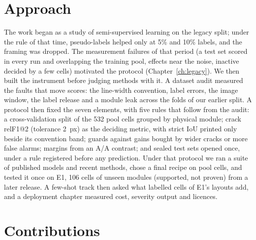 \section{Approach}\label{sec:intro-approach}

The work began as a study of semi-supervised learning on the legacy split; under the rule of that time, pseudo-labels helped only
at 5\% and 10\% labels, and the framing was dropped. The measurement failures of that period (a test set scored in every run and overlapping
the training pool, effects near the noise, inactive decided by a few cells) motivated the protocol (Chapter~\ref{ch:legacy}). We
then built the instrument before judging methods with it. A dataset audit measured the faults that move scores: the line-width
convention, label errors, the image window, the label release and a module leak across the folds of our earlier split. A protocol
then fixed the seven elements, with five rules that follow from the audit: a cross-validation split of the 532 pool cells grouped
by physical module; crack relF1@2 (tolerance 2~px) as the deciding metric, with strict IoU printed only beside its convention band;
guards against gains bought by wider cracks or more false alarms; margins from an A/A contrast; and sealed test sets opened once,
under a rule registered before any prediction. Under that protocol we ran a suite of published models and recent methods, chose a final recipe on pool cells, and
tested it once on E1, 106 cells of unseen modules (supported, not proven) from a later release. A few-shot track then asked what
labelled cells of E1's layouts add, and a deployment chapter measured cost, severity output and licences.

\section{Contributions}\label{sec:intro-contrib}

